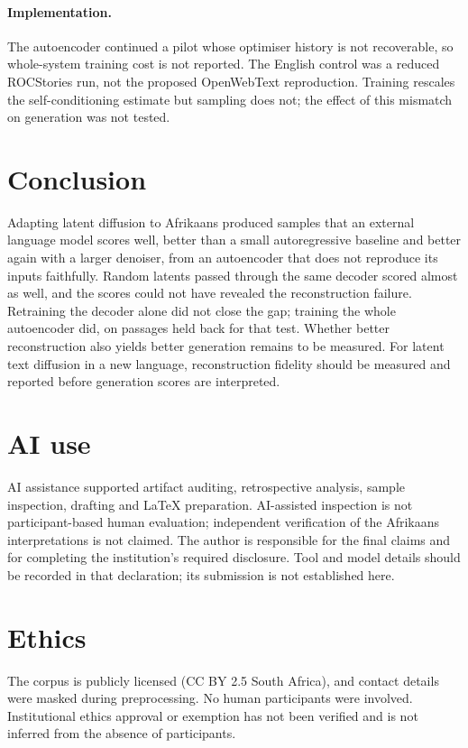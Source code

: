 \documentclass[11pt,a4paper]{article}
\begin{document}
\paragraph{Implementation.}
The autoencoder continued a pilot whose optimiser history is not recoverable, so whole-system training cost is not reported. The English control was a reduced ROCStories run, not the proposed OpenWebText reproduction. Training rescales the self-conditioning estimate but sampling does not; the effect of this mismatch on generation was not tested.

\section{Conclusion}

Adapting latent diffusion to Afrikaans produced samples that an external language model scores well, better than a small autoregressive baseline and better again with a larger denoiser, from an autoencoder that does not reproduce its inputs faithfully. Random latents passed through the same decoder scored almost as well, and the scores could not have revealed the reconstruction failure. Retraining the decoder alone did not close the gap; training the whole autoencoder did, on passages held back for that test. Whether better reconstruction also yields better generation remains to be measured. For latent text diffusion in a new language, reconstruction fidelity should be measured and reported before generation scores are interpreted.

\section*{AI use}
AI assistance supported artifact auditing, retrospective analysis, sample inspection, drafting and LaTeX preparation. AI-assisted inspection is not participant-based human evaluation; independent verification of the Afrikaans interpretations is not claimed. The author is responsible for the final claims and for completing the institution's required disclosure. Tool and model details should be recorded in that declaration; its submission is not established here.

\section*{Ethics}
The corpus is publicly licensed (CC BY 2.5 South Africa), and contact details were masked during preprocessing. No human participants were involved. Institutional ethics approval or exemption has not been verified and is not inferred from the absence of participants.
\end{document}

